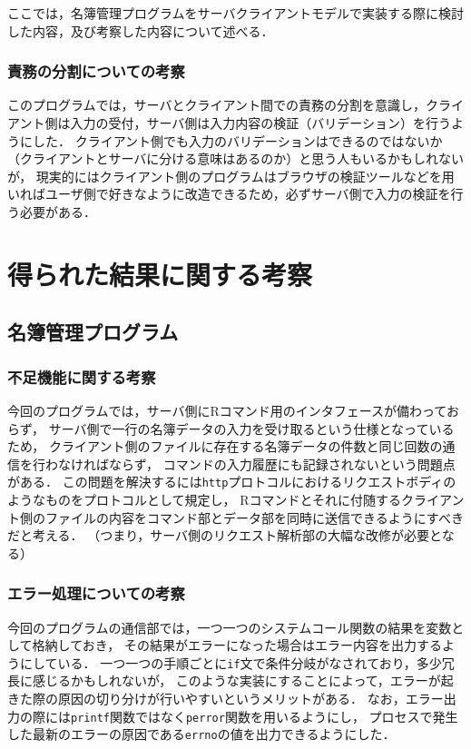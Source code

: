\documentclass[11pt]{jsarticle}
\begin{document}
ここでは，名簿管理プログラムをサーバクライアントモデルで実装する際に検討した内容，及び考察した内容について述べる．

\subsubsection{責務の分割についての考察}

このプログラムでは，サーバとクライアント間での責務の分割を意識し，クライアント側は入力の受付，サーバ側は入力内容の検証（バリデーション）を行うようにした．
クライアント側でも入力のバリデーションはできるのではないか（クライアントとサーバに分ける意味はあるのか）と思う人もいるかもしれないが，
現実的にはクライアント側のプログラムはブラウザの検証ツールなどを用いればユーザ側で好きなように改造できるため，必ずサーバ側で入力の検証を行う必要がある．

\section{得られた結果に関する考察}

\subsection{名簿管理プログラム}

\subsubsection{不足機能に関する考察}

今回のプログラムでは，サーバ側にRコマンド用のインタフェースが備わっておらず，
サーバ側で一行の名簿データの入力を受け取るという仕様となっているため，
クライアント側のファイルに存在する名簿データの件数と同じ回数の通信を行わなければならず，
コマンドの入力履歴にも記録されないという問題点がある．
この問題を解決するには{\tt http}プロトコルにおけるリクエストボディのようなものをプロトコルとして規定し，
Rコマンドとそれに付随するクライアント側のファイルの内容をコマンド部とデータ部を同時に送信できるようにすべきだと考える．
（つまり，サーバ側のリクエスト解析部の大幅な改修が必要となる）

\subsubsection{エラー処理についての考察}

今回のプログラムの通信部では，一つ一つのシステムコール関数の結果を変数として格納しておき，
その結果がエラーになった場合はエラー内容を出力するようにしている．
一つ一つの手順ごとに{\tt if}文で条件分岐がなされており，多少冗長に感じるかもしれないが，
このような実装にすることによって，エラーが起きた際の原因の切り分けが行いやすいというメリットがある．
なお，エラー出力の際には{\tt printf}関数ではなく{\tt perror}関数を用いるようにし，
プロセスで発生した最新のエラーの原因である{\tt errno}の値を出力できるようにした．
\end{document}
